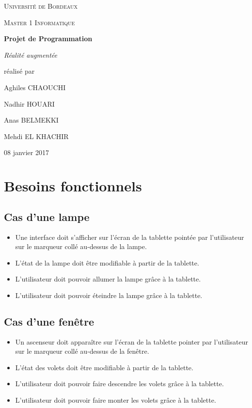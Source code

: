\documentclass[12pt,a4paper]{article}
\begin{document}
\begin{titlepage}
\centering
{\scshape\LARGE Université de Bordeaux \par}
{\scshape\Large Master 1 Informatique \par}
\vspace{3cm}

{\Huge\bfseries Projet de Programmation \par}%
\vspace{0.5cm}
{\Large\itshape Réalité augmentée \par}

\vfill
réalisé par \par
Aghiles \textsc{CHAOUCHI} \par
Nadhir \textsc{HOUARI} \par
Anas \textsc{BELMEKKI} \par
Mehdi \textsc{EL KHACHIR} \par
\vfill

{\large 08 janvier 2017\par}

\end{titlepage}

\section{Besoins fonctionnels}
\subsection{Cas d'une lampe}

\begin{itemize}
  \item Une interface doit s'afficher sur l'écran de la tablette pointée par l'utilisateur sur le marqueur collé au-dessus de la lampe.
  \item L'état de la lampe doit être modifiable à partir de la tablette.
  \item L'utilisateur doit pouvoir allumer la lampe grâce à la tablette.
  \item L'utilisateur doit pouvoir éteindre la lampe grâce à la tablette.
\end{itemize}

\subsection{Cas d'une fenêtre}
\begin{itemize} 
  \item Un ascenseur doit apparaître sur l'écran de la tablette pointer par l'utilisateur sur le marqueur collé au-dessus de la fenêtre.
  \item  L'état des volets doit être modifiable à partir de la tablette.
  \item L'utilisateur doit pouvoir faire descendre les volets grâce à la tablette.
  \item L'utilisateur doit pouvoir faire monter les volets grâce à la tablette.
\end{itemize}
 
\end{document}
